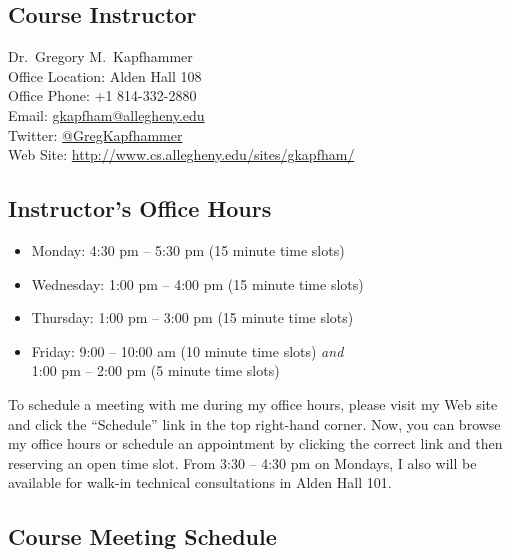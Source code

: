 

\usepackage[compact]{titlesec}



\subsection*{Course Instructor}
Dr.\ Gregory M.\ Kapfhammer\\
\noindent Office Location: Alden Hall 108 \\
\noindent Office Phone: +1 814-332-2880 \\
\noindent Email: \url{gkapfham@allegheny.edu} \\
\noindent Twitter: \url{@GregKapfhammer} \\
\noindent Web Site: \url{http://www.cs.allegheny.edu/sites/gkapfham/} 

\subsection*{Instructor's Office Hours}

\begin{itemize}
	\itemsep 0em
	\item Monday: 4:30 pm -- 5:30 pm (15 minute time slots)
	\item Wednesday: 1:00 pm -- 4:00 pm (15 minute time slots)
	\item Thursday: 1:00 pm -- 3:00 pm (15 minute time slots)
	\item Friday: 9:00 -- 10:00 am (10 minute time slots) {\em and} \\ \hspace*{.49in} 1:00 pm -- 2:00 pm (5 minute time slots)
\end{itemize}

\noindent 
To schedule a meeting with me during my office hours, please visit my Web site and click the ``Schedule'' link
in the top right-hand corner. Now, you can browse my office hours or schedule an appointment by clicking the correct
link and then reserving an open time slot. From 3:30 -- 4:30 pm on Mondays, I also will be available for walk-in
technical consultations in Alden Hall 101.  

\subsection*{Course Meeting Schedule}

